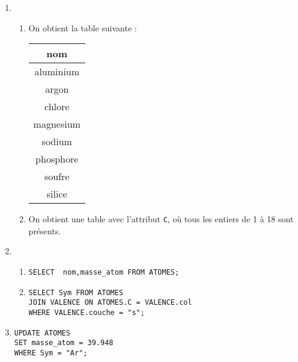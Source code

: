 \documentclass[a4paper,12pt,french]{article}
\begin{document}
\begin{enumerate}[\bfseries 1.]
    \item 	\begin{enumerate}[\bfseries a.]
               	\item 	 On obtient la table suivante :
                        \begin{center}
                            \begin{tabular}{|c|}
                                \hline
                                \textbf{nom}\\
                                \hline
                                aluminium \\
                                \hline
                                 argon\\
                                \hline     
                                 chlore    \\
                                \hline
                                  magnesium\\
                                \hline
                                sodium\\
                                \hline
                                phosphore\\
                                \hline
                                soufre\\
                                \hline
                                silice\\
                                \hline
                            \end{tabular}
                        \end{center}
           	    \item  On obtient une table avec l'attribut \texttt{C}, où tous les entiers de 1 à 18 sont présents.
            \end{enumerate}
    \item 	\begin{enumerate}[\bfseries a.]
    	   \item
\begin{verbatim}
SELECT  nom,masse_atom FROM ATOMES;
\end{verbatim}
            \item
\begin{verbatim}
SELECT Sym FROM ATOMES
JOIN VALENCE ON ATOMES.C = VALENCE.col
WHERE VALENCE.couche = "s";
\end{verbatim}
        \end{enumerate}
    \item 
\begin{verbatim}
UPDATE ATOMES
SET masse_atom = 39.948
WHERE Sym = "Ar";
\end{verbatim}
\end{enumerate}
\end{document}
